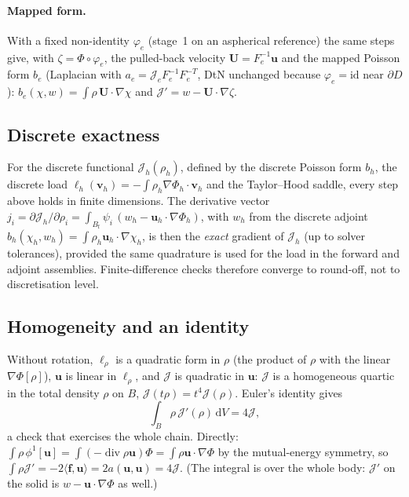 \documentclass[11pt]{article}
\newcommand{\Jf}{\mathscr{J}}  %
\newcommand{\Bf}{B_{\mathrm{f}}}
\newcommand{\bu}{\mathbf{u}}
\newcommand{\bv}{\mathbf{v}}
\newcommand{\bU}{\mathbf{U}}
\newcommand{\bff}{\mathbf{f}}
\newcommand{\dV}{\,\mathrm{d}V}
\renewcommand{\div}{\operatorname{div}}
\newcommand{\ip}[2]{\langle #1, #2\rangle}
\begin{document}
\paragraph{Mapped form.} With a fixed non-identity $\varphi_e$ (stage~1
on an aspherical reference) the same steps give, with $\zeta =
\Phi\circ\varphi_e$, the pulled-back velocity $\bU = F_e^{-1}\bu$ and the
mapped Poisson form $b_e$ (Laplacian with $a_e = \Jf _eF_e^{-1}F_e^{-T}$, DtN
unchanged because $\varphi_e = \mathrm{id}$ near $\partial D$):
$b_e(\chi,w) = \int\rho\,\bU\cdot\nabla\chi$ and $\Jf' = w - \bU\cdot\nabla\zeta$.

\subsection{Discrete exactness}

For the discrete functional $\Jf _h(\rho_h)$, defined by the discrete
Poisson form $b_h$, the discrete load $\ell_h(\bv_h) =
-\int\rho_h\nabla\Phi_h\cdot\bv_h$ and the Taylor--Hood saddle, every step
above holds in finite dimensions. The derivative vector
$j_i = \partial \Jf _h/\partial\rho_i = \int_{\Bf}\psi_i\,(w_h -
\bu_h\cdot\nabla\Phi_h)$, with $w_h$ from the discrete adjoint
$b_h(\chi_h,w_h) = \int\rho_h\bu_h\cdot\nabla\chi_h$, is then the
\emph{exact} gradient of $\Jf _h$ (up to solver tolerances), provided the
same quadrature is used for the load in the forward and adjoint
assemblies. Finite-difference checks therefore converge to round-off,
not to discretisation level.

\subsection{Homogeneity and an identity}

Without rotation, $\ell_\rho$ is a quadratic form in $\rho$ (the
product of $\rho$ with the linear $\nabla\Phi[\rho]$), $\bu$ is linear in
$\ell_\rho$, and $\Jf $ is quadratic in $\bu$: $\Jf $ is a homogeneous quartic
in the total density $\rho$ on $B$, $\Jf (t\rho) = t^4\Jf (\rho)$. Euler's
identity gives
\begin{equation}
  \int_B \rho\,\Jf'(\rho)\dV = 4\Jf  ,
  \label{eq:euler}
\end{equation}
a check that exercises the whole chain. Directly:
$\int\rho\,\phi^1[\bu] = \int(-\div\rho\bu)\Phi = \int\rho\bu\cdot\nabla\Phi$
by the mutual-energy symmetry, so $\int\rho \Jf' = -2\ip{\bff}{\bu} =
2a(\bu,\bu) = 4\Jf $. (The integral is over the whole body: $\Jf'$ on the
solid is $w - \bu\cdot\nabla\Phi$ as well.)
\end{document}
